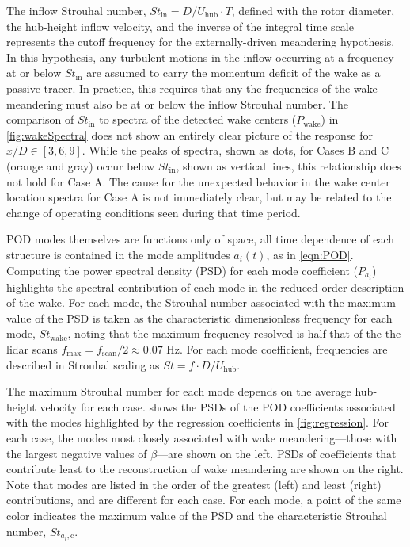 \documentclass[aip,amsmath,amssymb,preprint,]{revtex4-1}
\begin{document}
The inflow Strouhal number, $St_\text{in}=D/U_\text{hub}\cdot T $, defined with the rotor diameter, the hub-height inflow velocity, and the inverse of the integral time scale represents the cutoff frequency for the externally-driven meandering hypothesis.
In this hypothesis, any turbulent motions in the inflow occurring at a frequency at or below $St_\text{in}$ are assumed to carry the momentum deficit of the wake as a passive tracer.
In practice, this requires that any the frequencies of the wake meandering must also be at or below the inflow Strouhal number. 
The comparison of $St_\text{in}$ to spectra of the detected wake centers  ($P_\text{wake}$) in \cref{fig:wakeSpectra} does not show an entirely clear picture of the response for $x/D \in [3,6,9]$.
While the peaks of spectra, shown as dots, for Cases B and C (orange and gray) occur below $St_\text{in}$, shown as vertical lines, this relationship does not hold for Case A.
The cause for the unexpected behavior in the wake center location spectra for Case A is not immediately clear, but may be related to the change of operating conditions seen during that time period. 


POD modes themselves are functions only of space, all time dependence of each structure is contained in the mode amplitudes $a_i(t)$, as in \cref{eqn:POD}.
Computing the power spectral density (PSD) for each mode coefficient ($P_{a_i}$) highlights the spectral contribution of each mode in the reduced-order description of the wake.
For each mode, the Strouhal number associated with the maximum value of the PSD is taken as the characteristic dimensionless frequency for each mode, $St_\text{wake}$, noting that the maximum frequency resolved is half that of the the lidar scans $f_\text{max} = f_\text{scan}/2 \approx  0.07$ Hz. For each mode coefficient, frequencies are described in Strouhal scaling as $St = f\cdot D/U_\text{hub}$.

The maximum Strouhal number for each mode depends on the average hub-height velocity for each case. 
 shows the PSDs of the POD coefficients associated with the modes highlighted by the regression coefficients in \cref{fig:regression}.
For each case, the modes most closely associated with wake meandering---those with the largest negative values of $\beta$---are shown on the left. 
PSDs of coefficients that contribute least to the reconstruction of wake meandering are shown on the right.
Note that modes are listed in the order of the greatest (left) and least (right) contributions, and are different for each case.
For each mode, a point of the same color indicates the maximum value of the PSD and the characteristic Strouhal number, $St_{a_i, \text{c}}$.
\end{document}
